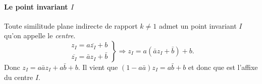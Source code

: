             \paragraph{Le point invariant $I$}
            Toute similitude plane indirecte de rapport $k \neq 1$ admet un point invariant $I$ qu'on appelle le \emph{centre}.
                  \[
                        \left.
                              \begin{array}{l}
                                    z_I = a \overline{z_I} + b \\
                                    \overline{z_I} = \bar{a} z_I + \bar{b} 
                              \end{array}
                        \right\rbrace
                              \Rightarrow 
                        z_I = a (\bar{a} z_I + \bar{b} ) + b.
                  \]
            Donc $z_I = a \bar{a} z_I + a \bar{b} + b$.
            Il vient que $(1-a\bar{a}) z_I = a\bar{b} + b$ et donc que
            \thmbox{
                  \[
                        z_I = \frac{a\bar{b}+b}{1 - a \bar{a}} (|a| \neq 1)
                  \]
            }
            est l'affixe du centre $I$.

